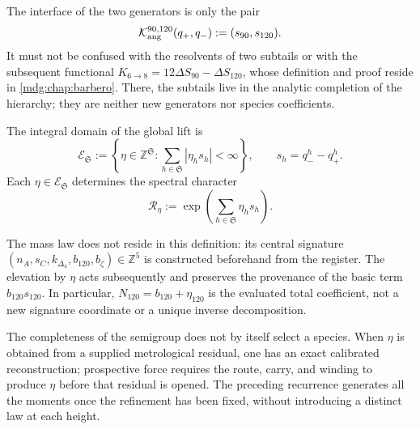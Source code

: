 The interface of the two generators is only the pair
\[
 \mathcal K_{\rm ang}^{90,120}(q_+,q_-):=(s_{90},s_{120}).
\]
It must not be confused with the resolvents of two subtails or with the subsequent
functional \(K_{6\to8}=12\Delta S_{90}-\Delta S_{120}\), whose definition and
proof reside in \cref{mdg:chap:barbero}. There, the subtails live in the
analytic completion of the hierarchy; they are neither new generators nor
species coefficients.

\begin{definition}
\label{def:modulo-refinamientos-torre-rev7}
The integral domain of the global lift is
\[
 \mathcal E_{\mathfrak S}
 :=\left\{\eta\in\mathbb Z^{\mathfrak S}:
 \sum_{h\in\mathfrak S}|\eta_hs_h|<\infty\right\},
 \qquad s_h=q_-^h-q_+^h.
\]
Each \(\eta\in\mathcal E_{\mathfrak S}\) determines the spectral character
\[
 \mathcal R_\eta
 :=\exp\!\left(\sum_{h\in\mathfrak S}\eta_hs_h\right).
\]
\end{definition}

The mass law does not reside in this definition: its central signature
\((n_A,s_C,k_{\Delta_4},b_{120},b_\zeta)\in\mathbb Z^5\) is constructed beforehand
from the register. The elevation by \(\eta\) acts subsequently and preserves the
provenance of the basic term \(b_{120}s_{120}\). In particular,
\(N_{120}=b_{120}+\eta_{120}\) is the evaluated total coefficient, not a
new signature coordinate or a unique inverse decomposition.

The completeness of the semigroup does not by itself select a species. When
\(\eta\) is obtained from a supplied metrological residual, one has an
exact calibrated reconstruction; prospective force requires the route,
carry, and winding to produce \(\eta\) before that residual is opened. The
preceding recurrence generates all the moments once the
refinement has been fixed, without introducing a distinct law at each height.
